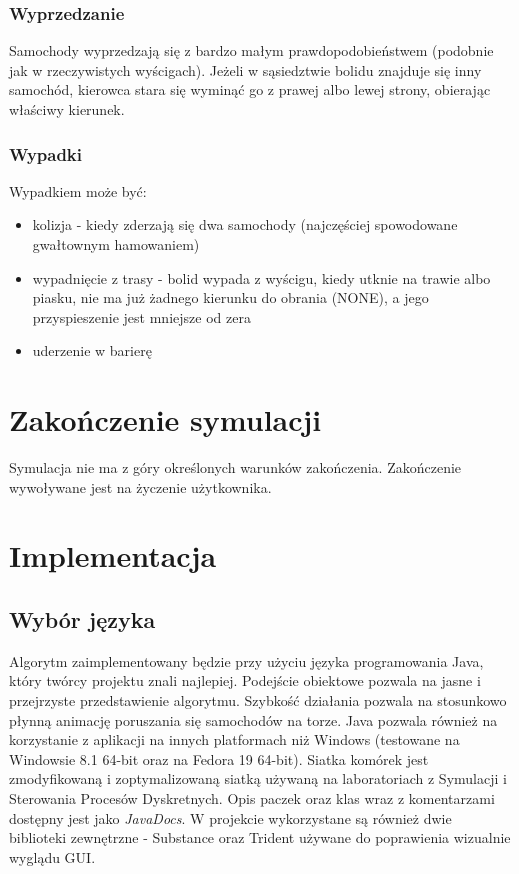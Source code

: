 \documentclass{article}
\begin{document}
\subsubsection{Wyprzedzanie}
Samochody wyprzedzają się z bardzo małym prawdopodobieństwem (podobnie jak w rzeczywistych wyścigach). Jeżeli w sąsiedztwie bolidu znajduje się inny samochód, kierowca stara się wyminąć go z prawej albo lewej strony, obierając właściwy kierunek. 

\subsubsection{Wypadki}
Wypadkiem może być:
\begin{itemize}
\item kolizja - kiedy zderzają się dwa samochody (najczęściej spowodowane gwałtownym hamowaniem)
\item wypadnięcie z trasy - bolid wypada z wyścigu, kiedy utknie na trawie albo piasku, nie ma już żadnego kierunku do obrania (NONE), a jego przyspieszenie jest mniejsze od zera
\item uderzenie w barierę
\end{itemize}

\section{Zakończenie symulacji}
Symulacja nie ma z góry określonych warunków zakończenia. Zakończenie wywoływane jest na życzenie użytkownika.

\pagebreak

\section{Implementacja}
\subsection{Wybór języka}
Algorytm zaimplementowany będzie przy użyciu języka programowania Java, który twórcy projektu znali najlepiej. Podejście obiektowe pozwala na jasne i przejrzyste przedstawienie algorytmu. Szybkość działania pozwala na stosunkowo płynną animację poruszania się samochodów na torze. Java pozwala również na korzystanie z aplikacji na innych platformach niż Windows (testowane na Windowsie 8.1 64-bit oraz na Fedora 19 64-bit). Siatka komórek jest zmodyfikowaną i zoptymalizowaną siatką używaną na laboratoriach z Symulacji i Sterowania Procesów Dyskretnych. Opis paczek oraz klas wraz z komentarzami dostępny jest jako \textit{JavaDocs}. W projekcie wykorzystane są również dwie biblioteki zewnętrzne - Substance oraz Trident używane do poprawienia wizualnie wyglądu GUI.
\end{document}
